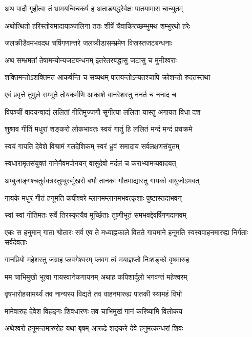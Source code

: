 \twolineshloka
{अथ पादौ गृहीत्वा तं भ्रामयन्विचकर्ष ह}
{अताडयद्धरेर्वक्षः पातयामास चाच्युतम्}%

\twolineshloka
{अथोत्थितो हरिस्तोयमादायाञ्जलिना ततः}
{शीर्षे चैवाकिरच्छम्भुमथ शम्भुरथो हरेः}%

\twolineshloka
{जलक्रीडैवमभवदथ चर्षिगणान्तरे}
{जलक्रीडासम्भ्रमेण विस्रस्तजटबन्धनाः}%

\twolineshloka
{अथ सम्भ्रमतां तेषामन्योन्यजटबन्धनम्}
{इतरेतरबद्धासु जटासु च मुनीश्वराः}%

\twolineshloka
{शक्तिमन्तोऽशक्तिमत आकर्षन्ति च सव्यथम्}
{पातयन्तोऽन्यतश्चापि क्रोशन्तो रुदतस्तथा}%

\twolineshloka
{एवं प्रवृत्ते तुमुले सम्भूते तोयकर्मणि}
{आकाशे वानरेशस्तु ननर्त च ननाद च}%

\twolineshloka
{विपञ्चीं वादयन्वाद्यं ललितां गीतिमुज्जगौ}
{सुगीत्या ललिता यास्तु अगायत विधा दश}%

\twolineshloka
{शुश्राव गीतिं मधुरां शङ्करो लोकभावतः}
{स्वयं गातुं हि ललितं मन्दं मन्दं प्रचक्रमे}%

\twolineshloka
{स्वयं गायति देवेशे विश्रामं गलदेशिकम्}
{स्वरं ध्रुवं समादाय सर्वलक्षणसंयुतम्}%

\twolineshloka
{स्वधारामृतसंयुक्तं गानेनैवमपोनयन्}
{वासुदेवो मर्दलं च कराभ्यामप्यवादयत्}%

\twolineshloka
{अम्बुजाङ्गश्चतुर्वक्त्रस्तुम्बुरुर्मुखरो बभौ}
{तानका गौतमाद्यास्तु गायको वायुजोऽभवत्}%

\twolineshloka
{गायके मधुरं गीतं हनूमति कपीश्वरे}
{म्लानमम्लानमभवत्कृशाः पुष्टास्तदाभवन्}%

\twolineshloka
{स्वां स्वां गीतिमतः सर्वे तिरस्कृत्यैव मूर्च्छिताः}
{तूष्णीभूतं समभवद्देवर्षिगणदानवम्}%

\threelineshloka
{एकः स हनुमान् गाता श्रोतारः सर्व एव ते}
{मध्याह्नकाले वितते गायमाने हनूमति}
{स्वस्ववाहनमारुह्य निर्गताः सर्वदेवताः}%

\twolineshloka
{गानप्रियो महेशस्तु जग्राह प्लवगेश्वरम्}
{प्लवग त्वं मयाज्ञप्तो निःशङ्को वृषमारुह}%

\twolineshloka
{मम चाभिमुखो भूत्वा गायस्वानेकगायनम्}
{अथाह कपिशार्दूलो भगवन्तं महेश्वरम्}%

\twolineshloka
{वृषभारोहसामर्थ्यं तव नान्यस्य विद्यते}
{तव वाहनमारुह्य पातकी स्यामहं विभो}%

\twolineshloka
{मामेवारुह देवेश विहङ्गः शिवधारणः}
{तव चाभिमुखं गानं करिष्यामि विलोकय}%

\twolineshloka
{अथेश्वरो हनूमन्तमारुरोह यथा बृषम्}
{आरूढे शङ्करे देवे हनुमत्कन्धरां शिवः}%

